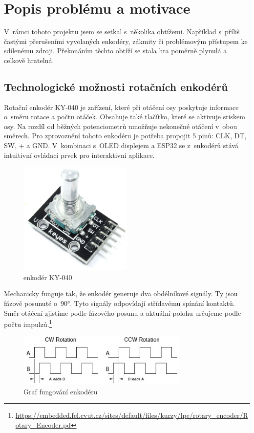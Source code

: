 \documentclass[a4paper,11pt]{article}
\begin{document}
\section{Popis problému a motivace}
V~rámci tohoto projektu jsem se setkal s~několika obtížemi.
Například s~příliš častými přerušeními vyvolaných enkodéry, zákmity či problémovým přístupem ke sdílenému zdroji. 
Překonáním těchto obtíží se stala hra poměrně plynulá a celkově hratelná.

\subsection{Technologické možnosti rotačních enkodérů} 
Rotační enkodér KY-040 je zařízení, které při otáčení osy poskytuje informace o~směru rotace a počtu otáček. 
Obsahuje také tlačítko, které se aktivuje stiskem osy. 
Na rozdíl od běžných potenciometrů umožňuje nekonečné otáčení v~obou směrech.
Pro zprovoznění tohoto enkodéru je potřeba propojit 5 pinů: CLK, DT, SW, + a GND.
V~kombinaci s~OLED displejem a ESP32 se z~enkodérů stává intuitivní ovládací prvek pro interaktivní aplikace.

\begin{figure}[H]
    \centering
    \includegraphics[width=0.5\textwidth]{obrazky-figures/enkoder.jpeg}
    \caption{enkodér KY-040}
\end{figure}

Mechanicky funguje tak, že enkodér generuje dva obdélníkové signály. 
Ty jsou fázově posunuté o~90°. 
Tyto signály odpovídají střídavému spínání kontaktů. 
Směr otáčení zjistíme podle fázového posunu a aktuální polohu určujeme podle počtu impulzů.\footnote{\url{https://embedded.fel.cvut.cz/sites/default/files/kurzy/lpe/rotary_encoder/Rotary_Encoder.pd}}

\begin{figure}[H]
    \centering
    \includegraphics[width=0.75\textwidth]{obrazky-figures/graf_enkoder.jpg}
    \caption[Caption for LOF]{Graf fungování enkodéru\footnotemark}
\end{figure}
\end{document}
